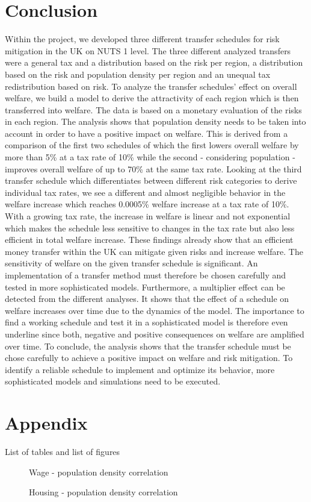 \documentclass[10pt,a4paper]{article}
\begin{document}
\section{Conclusion}
Within the project, we developed three different transfer schedules for risk mitigation in the UK on NUTS 1 level. The three different analyzed transfers were a general tax and a distribution based on the risk per region, a distribution based on the risk and population density per region and an unequal tax redistribution based on risk. 
To analyze the transfer schedules' effect on overall welfare, we build a model to derive the attractivity of each region which is then transferred into welfare. The data is based on a monetary evaluation of the risks in each region. 
The analysis shows that population density needs to be taken into account in order to have a positive impact on welfare. This is derived from a comparison of the first two schedules of which the first lowers overall welfare by more than 5\% at a tax rate of 10\% while the second - considering population - improves overall welfare of up to 70\% at the same tax rate. Looking at the third transfer schedule which differentiates between different risk categories to derive individual tax rates, we see a different and almost negligible behavior in the welfare increase which reaches 0.0005\% welfare increase at a tax rate of 10\%. With a growing tax rate, the increase in welfare is linear and not exponential which makes the schedule less sensitive to changes in the tax rate but also less efficient in total welfare increase. These findings already show that an efficient money transfer within the UK can mitigate given risks and increase welfare. The sensitivity of welfare on the given transfer schedule is significant. An implementation of a transfer method must therefore be chosen carefully and tested in more sophisticated models. Furthermore, a multiplier effect can be detected from the different analyses. It shows that the effect of a schedule on welfare increases over time due to the dynamics of the model. The importance to find a working schedule and test it in a sophisticated model is therefore even underline since both, negative and positive consequences on welfare are amplified over time.
To conclude, the analysis shows that the transfer schedule must be chose carefully to achieve a positive impact on welfare and risk mitigation. To identify a reliable schedule to implement and optimize its behavior, more sophisticated models and simulations need to be executed.
\newpage
\section{Appendix}
List of tables and list of figures

\begin{figure}[H]
  \centering
  
  \caption{Wage - population density correlation}
  \label{dg:wage-pop}
\end{figure}

\begin{figure}[H]
  \centering
  
  \caption{Housing - population density correlation}
  \label{dg:housing-pop}
\end{figure}

\newpage
\printbibliography
\end{document}

